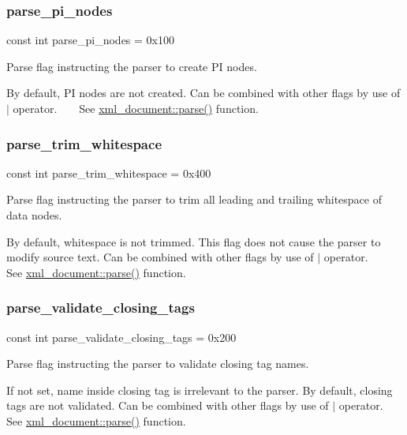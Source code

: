 \subsubsection{\texorpdfstring{parse\+\_\+pi\+\_\+nodes}{parse\_pi\_nodes}}
{\footnotesize\ttfamily const int parse\+\_\+pi\+\_\+nodes = 0x100}



Parse flag instructing the parser to create PI nodes. 

By default, PI nodes are not created. Can be combined with other flags by use of $\vert$ operator. ~\newline
~\newline
 See \mbox{\hyperlink{classrapidxml_1_1xml__document_aa280fd704731128b4556b41c1e9182b8}{xml\+\_\+document\+::parse()}} function. \mbox{\label{namespacerapidxml_aac1f06b1afd47b812732fb521b146fd9}} 
\subsubsection{\texorpdfstring{parse\+\_\+trim\+\_\+whitespace}{parse\_trim\_whitespace}}
{\footnotesize\ttfamily const int parse\+\_\+trim\+\_\+whitespace = 0x400}



Parse flag instructing the parser to trim all leading and trailing whitespace of data nodes. 

By default, whitespace is not trimmed. This flag does not cause the parser to modify source text. Can be combined with other flags by use of $\vert$ operator. ~\newline
~\newline
 See \mbox{\hyperlink{classrapidxml_1_1xml__document_aa280fd704731128b4556b41c1e9182b8}{xml\+\_\+document\+::parse()}} function. \mbox{\label{namespacerapidxml_aa5daff9d61c7d4eaf98e4d42efe628ee}} 
\subsubsection{\texorpdfstring{parse\+\_\+validate\+\_\+closing\+\_\+tags}{parse\_validate\_closing\_tags}}
{\footnotesize\ttfamily const int parse\+\_\+validate\+\_\+closing\+\_\+tags = 0x200}



Parse flag instructing the parser to validate closing tag names. 

If not set, name inside closing tag is irrelevant to the parser. By default, closing tags are not validated. Can be combined with other flags by use of $\vert$ operator. ~\newline
~\newline
 See \mbox{\hyperlink{classrapidxml_1_1xml__document_aa280fd704731128b4556b41c1e9182b8}{xml\+\_\+document\+::parse()}} function. 